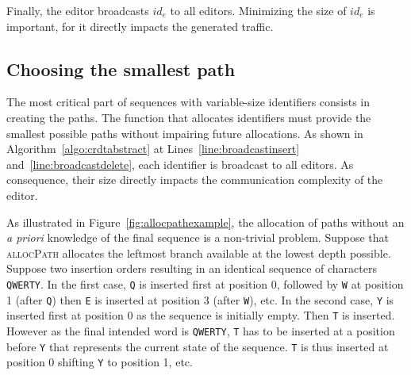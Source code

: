 \noindent Finally, the editor broadcasts $id_{e}$ to all editors. Minimizing the
size of $id_e$ is important, for it directly impacts the generated traffic.


\subsection{Choosing the smallest path}
\label{subsec:choosing}

The most critical part of sequences with variable-size identifiers consists in
creating the paths. The function that allocates identifiers must provide the
smallest possible paths without impairing future allocations. As shown in
Algorithm~\ref{algo:crdtabstract} at Lines~\ref{line:broadcastinsert}
and~\ref{line:broadcastdelete}, each identifier is broadcast to all editors. As
consequence, their size directly impacts the communication complexity of the
editor.



\begin{figure*}
  \centering
  \hspace{50pt}
  \caption{\label{fig:allocpathexample} Two trees filled with the resulting
    identifiers of two different permutations resulting in an identical sequence
    \texttt{QWERTY}. The function \textsc{allocPath} allocates the leftmost
    branch in the tree. All paths of the optimal case have a length of 1 while
    the tree of the worst case grows up to a depth of 6.}
\end{figure*}

As illustrated in Figure~\ref{fig:allocpathexample}, the allocation of paths
without an \emph{a priori} knowledge of the final sequence is a non-trivial
problem.  Suppose that \textsc{allocPath} allocates the leftmost branch
available at the lowest depth possible. Suppose two insertion orders resulting
in an identical sequence of characters \texttt{QWERTY}.  In the first case,
\texttt{Q} is inserted first at position 0, followed by \texttt{W} at position 1
(after \texttt{Q}) then \texttt{E} is inserted at position 3 (after \texttt{W}),
etc.  In the second case, \texttt{Y} is inserted first at position 0 as the
sequence is initially empty. Then \texttt{T} is inserted. However as the final
intended word is \texttt{QWERTY}, \texttt{T} has to be inserted at a position
before \texttt{Y} that represents the current state of the sequence. \texttt{T}
is thus inserted at position 0 shifting \texttt{Y} to position 1, etc.


